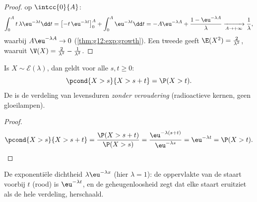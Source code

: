 \begin{proof}
 op $\intcc{0}{A}$:
\[
\int_0^A t\,\lambda\eu^{-\lambda t}\dd t
= \bigl[-t\,\eu^{-\lambda t}\bigr]_0^A + \int_0^A \eu^{-\lambda t}\dd t
= -A\eu^{-\lambda A} + \frac{1 - \eu^{-\lambda A}}{\lambda}
\xrightarrow[A\to+\infty]{} \frac1\lambda,
\]
waarbij $A\eu^{-\lambda A} \to 0$ (\cref{thm:g12:exp:growth}). Een tweede
 geeft $\E(X^2) = \frac{2}{\lambda^2}$, waaruit
$\V(X) = \frac{2}{\lambda^2} - \frac{1}{\lambda^2}$.
\end{proof}

\begin{theorem}[Geheugenloosheid]\label{thm:g12:contdist:memoryless}
Is $X \sim \mathcal E(\lambda)$, dan geldt voor alle $s, t \geq 0$:
\[
\pcond{X > s}{X > s + t} = \P(X > t) .
\]
De  is de verdeling van levensduren \emph{zonder
veroudering} (radioactieve kernen, geen gloeilampen).
\end{theorem}

\begin{proof}
\[
\pcond{X > s}{X > s+t}
= \frac{\P(X > s + t)}{\P(X > s)}
= \frac{\eu^{-\lambda(s+t)}}{\eu^{-\lambda s}} = \eu^{-\lambda t}
= \P(X > t). \qedhere
\]
\end{proof}

\begin{omfigure}

{\small De exponentiële dichtheid $\lambda\eu^{-\lambda x}$ (hier
$\lambda = 1$): de oppervlakte van de staart voorbij $t$ (rood) is
$\eu^{-\lambda t}$, en de geheugenloosheid zegt dat elke staart eruitziet als
de hele verdeling, herschaald.}
\end{omfigure}

